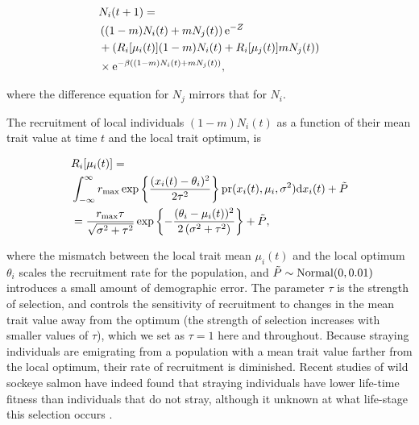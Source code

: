 \documentclass{revtex4}
\begin{document}
\begin{align}
  &N_i(t+1) = \\ \nonumber
  &\left((1-m)N_i(t) + m N_j(t) \right){\rm e}^{-Z} \\ \nonumber
  &+ \left(R_i[\mu_i(t)] (1-m)N_i(t) + R_i[\mu_j(t)] m N_j(t)\right) \\ \nonumber
  &\times {\rm e}^{-\beta ((1-m)N_i(t) + m N_j(t))},
  \label{eq:N}
\end{align}

\noindent where the difference equation for $N_j$ mirrors that for $N_i$.

The recruitment of local individuals $(1-m)N_i(t)$ as a function of their mean trait value at time $t$ and the local trait optimum, is

\begin{align}
  &R_i[\mu_i(t)] = \\ \nonumber
  &\int_{-\infty}^\infty r_{\rm max}\exp\left\{\frac{(x_i(t)-\theta_i)^2}{2\tau^2}\right\} {\rm pr}(x_i(t),\mu_i,\sigma^2) {\rm d}x_i(t) +\tilde{P}\\ \nonumber
  &= \frac{r_{\rm max} \tau  }{\sqrt{\sigma ^2+\tau ^2}}\exp\left\{-\frac{(\theta_i-\mu_i(t))^2}{2 \left(\sigma ^2+\tau ^2\right)}\right\} +\tilde{P},
  \label{eq:R}
\end{align}

\noindent where the mismatch between the local trait mean $\mu_i(t)$ and the local optimum $\theta_i$ scales the recruitment rate for the population, and $\tilde{P}\sim {\rm Normal}(0,0.01)$ introduces a small amount of demographic error.
The parameter $\tau$ is the strength of selection, and controls the sensitivity of recruitment to changes in the mean trait value away from the optimum (the strength of selection increases with smaller values of $\tau$), which we set as $\tau=1$ here and throughout.
Because straying individuals are emigrating from a population with a mean trait value farther from the local optimum, their rate of recruitment is diminished.
Recent studies of wild sockeye salmon have indeed found that straying individuals have lower life-time fitness than individuals that do not stray, although it unknown at what life-stage this selection occurs \citep{Peterson:2014gy}.
\\
\end{document}
